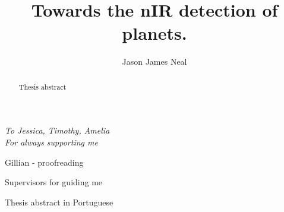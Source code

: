 \documentclass[fleqn]{fcup-thesis}
\author{Jason James Neal}
\title{Towards the nIR detection of planets.}
\begin{document}
	
	\begin{preliminary}
		
		\maketitle
		\cleardoublepage
		
		
		\begin{dedication}
			\centering \huge \itshape
			To Jessica, Timothy, Amelia\\For always supporting me
		\end{dedication}
		
		
		\begin{acknowledgements}
			
			Gillian - proofreading
			
			Supervisors for guiding me
			
			\vspace{7mm}
			
			
		\end{acknowledgements}
		
		
		
		\begin{abstract}
			
			Thesis abstract
		\end{abstract}
		
		\begin{abstract-pt}
			
			Thesis abstract in Portuguese
		\end{abstract-pt}
		
		
        \todototoc
		\listoftodos
        
		\tableofcontents
		\listoftables
		\listoffigures
        
       
        
        
		\begin{abbreviations}		
			\begin{longtable}{ll}
				

\end{longtable}
\end{abbreviations}
\end{preliminary}
\end{document}
